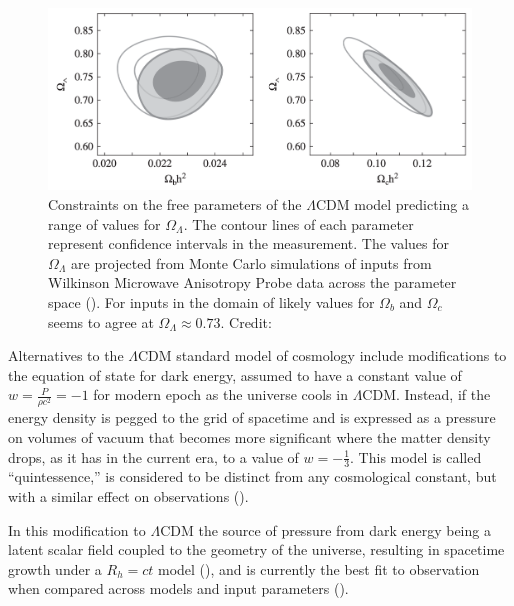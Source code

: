 \documentclass{paper}
\begin{document}
  \begin{figure}[H]
    \begin{centering}
    \includegraphics[scale=0.5]{DE-MCMC.pdf}
    \caption{Constraints on the free parameters of the $\Lambda$CDM
      model predicting a range of values for \(\Omega_{\Lambda}\). The contour 
      lines of each parameter represent confidence intervals in the 
      measurement. The values for \(\Omega_{\Lambda}\) are projected from
      Monte Carlo simulations of inputs from Wilkinson Microwave Anisotropy
      Probe data across the parameter space (\cite{Bennett_2011}).
      For inputs in the domain of likely values for \(\Omega_b\) and 
      \(\Omega_c\) seems to agree at \(\Omega_{\Lambda} \approx 0.73\).
    Credit: \cite{liddle2015introduction}}
    \label{fig:DE-constraints}
    \end{centering}
  \end{figure}

  Alternatives to the $\Lambda$CDM standard model of cosmology include
  modifications to the equation of state for dark energy, assumed to have a
  constant value of \(w = \frac{P}{\rho c^2} = -1\) for modern epoch as the
  universe cools in $\Lambda$CDM. Instead, if the energy density is pegged
  to the grid of spacetime and is expressed as a pressure on volumes of
  vacuum that becomes more significant where the matter density drops, as it
  has in the current era, to a value of \(w = -\frac{1}{3}\). This model is 
  called ``quintessence,'' is considered to be distinct from any 
  cosmological constant, but with a similar effect on observations
  (\cite{PhysRevLett.80.1582}). 

  In this modification to $\Lambda$CDM the source of pressure from dark 
  energy being a latent scalar field coupled to the geometry of the universe, 
  resulting in spacetime growth under a \(R_h = ct\) model 
  (\cite{10.1093/mnras/stv3012}), and is currently the best fit to observation 
  when compared across models and input parameters 
  (\cite{10.1093/mnras/sty1962}).
\end{document}

